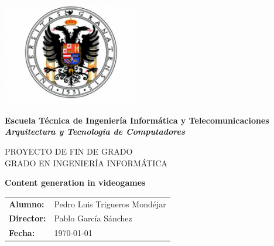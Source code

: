 %
%

%

\begin{titlepage}

	\begin{center}
		
		\includegraphics[width=6cm]{./eps/logo-ugr.eps}
		\vspace{2cm}

		{\Large{\textbf{Escuela Técnica de Ingeniería Informática y Telecomunicaciones}}}
		\\
		{\it \large{\textbf{Arquitectura y Tecnología de Computadores}}}
		\vspace{1cm}

		{\large PROYECTO DE FIN DE GRADO\\GRADO EN INGENIERÍA INFORMÁTICA}
		\vspace{1cm}

		\textbf{\Large Content generation in videogames}
		\vspace{7cm}
	\end{center}

	\begin{flushright}
		\begin{tabular}{ll}
			\large{\textbf{Alumno:}}	&
			\large{Pedro Luis Trigueros Mondéjar} \\

			\large{\textbf{Director:}}	&
			\large{Pablo García Sánchez} \\

			\large{\textbf{Fecha:}}	&
			\large{\today} \\
		\end{tabular}
	\end{flushright}

\end{titlepage}

